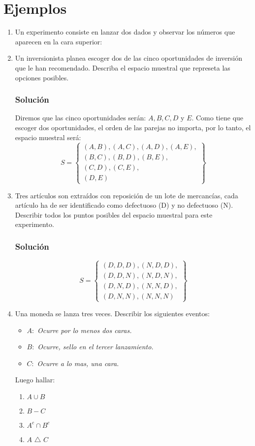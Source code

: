 \section{Ejemplos}
\begin{enumerate}
\item Un experimento consiste en lanzar dos dados y observar los números que aparecen en la cara superior:
\item Un inversionista planea escoger dos de las cinco oportunidades de inversión que le han recomendado. Describa el espacio muestral que represeta las opciones posibles.
\subsubsection{Solución}
Diremos que las cinco oportunidades serán: $A,B,C,D$ y $E$. Como tiene que escoger dos oportunidades, el orden de las parejas no importa, por lo tanto, el espacio muestral será:
\begin{equation*}
S=
\left\lbrace 
\begin{aligned}
(A,B),(A,C),(A,D),(A,E), \\
(B,C),(B,D),(B,E), \\
(C,D),(C,E), \\
(D,E)
\end{aligned}
\right\rbrace 
\end{equation*}
\item Tres artículos son extraídos con reposición de un lote de mercancías, cada artículo ha de ser identificado como defectuoso (D) y no defectuoso (N). Describir todos los puntos posibles del espacio muestral para este experimento.
\subsubsection{Solución}
\begin{equation*}
S=
\left\lbrace 
\begin{aligned}
(D,D,D),(N,D,D),\\
(D,D,N),(N,D,N),\\
(D,N,D),(N,N,D),\\
(D,N,N),(N,N,N)
\end{aligned}
\right\rbrace 
\end{equation*}
\item Una moneda se lanza tres veces. Describir los siguientes eventos:
\begin{itemize}
\item $A:$ \textit{Ocurre por lo menos dos caras.}
\item $B:$ \textit{Ocurre, sello en el tercer lanzamiento.}
\item $C:$ \textit{Ocurre a lo mas, una cara.}
\end{itemize}
Luego hallar:
\begin{enumerate}
\item $A\cup B$
\item $B-C$
\item $A^c \cap B^c$
\item $A$ {\footnotesize $\triangle$} $C$
\end{enumerate}

\end{enumerate}
